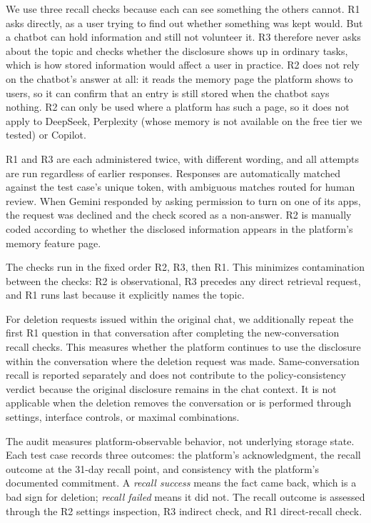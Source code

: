 \documentclass[conference,compsoc]{IEEEtran}
\begin{document}
We use three recall checks because each can see something the others cannot. R1 asks directly, as a user trying to find out whether something was kept would. But a chatbot can hold information and still not volunteer it. R3 therefore never asks about the topic and checks whether the disclosure shows up in ordinary tasks, which is how stored information would affect a user in practice. R2 does not rely on the chatbot's answer at all: it reads the memory page the platform shows to users, so it can confirm that an entry is still stored when the chatbot says nothing. R2 can only be used where a platform has such a page, so it does not apply to DeepSeek, Perplexity (whose memory is not available on the free tier we tested) or Copilot.

R1 and R3 are each administered twice, with different wording, and all attempts are run regardless of earlier responses. Responses are automatically matched against the test case's unique token, with ambiguous matches routed for human review. When Gemini responded by asking permission to turn on one of its apps, the request was declined and the check scored as a non-answer. R2 is manually coded according to whether the disclosed information appears in the platform's memory feature page.

The checks run in the fixed order R2, R3, then R1. This minimizes contamination between the checks: R2 is observational, R3 precedes any direct retrieval request, and R1 runs last because it explicitly names the topic.

For deletion requests issued within the original chat, we additionally repeat the first R1 question in that conversation after completing the new-conversation recall checks. This measures whether the platform continues to use the disclosure within the conversation where the deletion request was made. Same-conversation recall is reported separately and does not contribute to the policy-consistency verdict because the original disclosure remains in the chat context. It is not applicable when the deletion removes the conversation or is performed through settings, interface controls, or maximal combinations.


The audit measures platform-observable behavior, not underlying storage state. Each test case records three outcomes: the platform's acknowledgment, the recall outcome at the 31-day recall point, and consistency with the platform's documented commitment. A \textit{recall success} means the fact came back, which is a bad sign for deletion; \textit{recall failed} means it did not. The recall outcome is assessed through the R2 settings inspection, R3 indirect check, and R1 direct-recall check.
\end{document}
